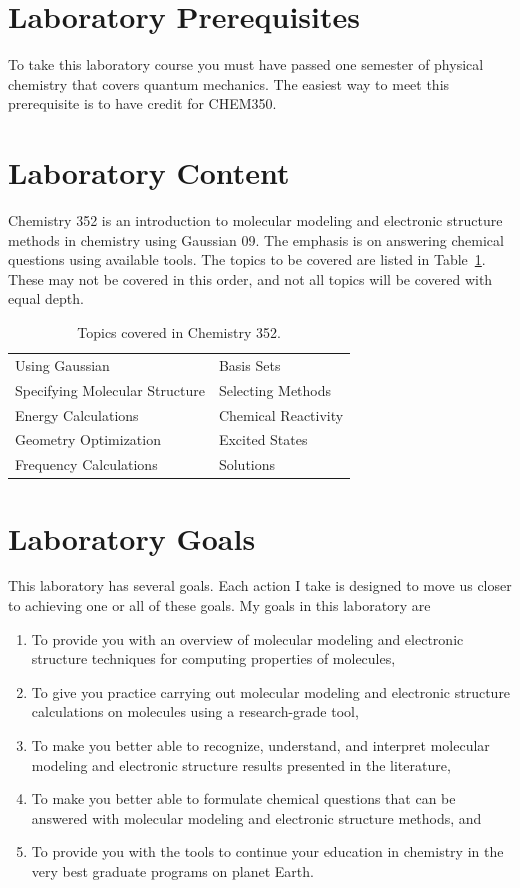 \documentclass[letterpaper,oneside,onecolumn,11pt,article]{memoir}
\begin{document}
\section{Laboratory Prerequisites}
To take this laboratory course you must have passed one semester of physical chemistry that covers quantum mechanics. The easiest way to meet this prerequisite is to have credit for CHEM350. 

\section{Laboratory Content}
Chemistry 352 is an introduction to molecular modeling and electronic structure methods in chemistry using Gaussian 09. The emphasis is on answering chemical questions using available tools. The topics to be covered are listed in Table~\ref{tab:topics}. These may not be covered in this order, and not all topics will be covered with equal depth. 

\begin{table}[h]
\caption{\sffamily Topics covered in Chemistry 352.}
\label{tab:topics}
\begin{tabular}{l|l} \toprule
Using Gaussian & Basis Sets \\
Specifying Molecular Structure & Selecting Methods \\
Energy Calculations & Chemical Reactivity \\
Geometry Optimization & Excited States \\
Frequency Calculations & Solutions \\ 
\bottomrule
\end{tabular}
\end{table}
%
%
\section{Laboratory Goals}
This laboratory has several goals. Each action I take is designed to move us closer to achieving one or all of these goals. My goals in this laboratory are
\begin{enumerate}[1.]
\item To provide you with an overview of molecular modeling and electronic structure techniques for computing properties of molecules,
\item To give you practice carrying out molecular modeling and electronic structure calculations on molecules using a research-grade tool,
\item To make you better able to recognize, understand, and interpret molecular modeling and electronic structure results presented in the literature,
\item To make you better able to formulate chemical questions that can be answered with molecular modeling and electronic structure methods, and
\item To provide you with the tools to continue your education in chemistry in the very best graduate programs on planet Earth.
\end{enumerate}
%
%
\end{document}
